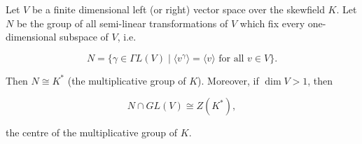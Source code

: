 Let $V$ be a finite dimensional left (or right) vector space over the skewfield $K$. Let $N$ be the group of all semi-linear transformations of $V$ which fix every one-dimensional subspace of $V$, i.e.

$$N = \{\gamma \in \Gamma L(V) \mid \langle v^\gamma \rangle = \langle v \rangle \text{ for all } v \in V\}.$$

Then $N \cong K^*$ (the multiplicative group of $K$). Moreover, if $\dim V > 1$, then

$$N \cap GL(V) \cong Z(K^*),$$

the centre of the multiplicative group of $K$.

